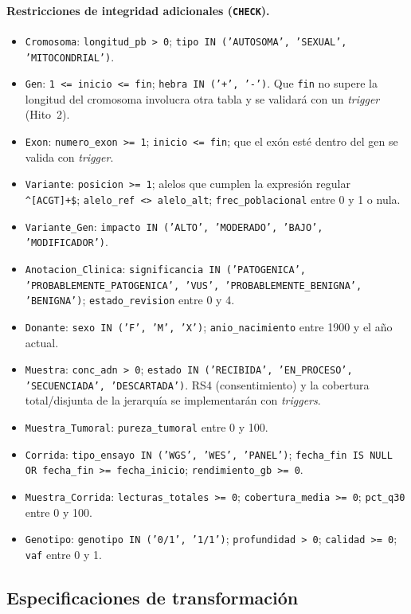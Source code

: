 \documentclass[11pt,a4paper]{article}
\newcommand{\tb}[1]{\texttt{#1}}
\begin{document}
\paragraph{Restricciones de integridad adicionales (\tb{CHECK}).}\begingroup\sloppy
\begin{itemize}
  \item \tb{Cromosoma}: \tb{longitud\_pb > 0}; \tb{tipo IN ('AUTOSOMA', 'SEXUAL', 'MITOCONDRIAL')}.
  \item \tb{Gen}: \tb{1 <= inicio <= fin}; \tb{hebra IN ('+', '-')}. Que \tb{fin} no supere la longitud del cromosoma involucra otra tabla y se validará con un \emph{trigger} (Hito~2).
  \item \tb{Exon}: \tb{numero\_exon >= 1}; \tb{inicio <= fin}; que el exón esté dentro del gen se valida con \emph{trigger}.
  \item \tb{Variante}: \tb{posicion >= 1}; alelos que cumplen la expresión regular \tb{\textasciicircum[ACGT]+\$}; \tb{alelo\_ref <> alelo\_alt}; \tb{frec\_poblacional} entre 0 y 1 o nula.
  \item \tb{Variante\_Gen}: \tb{impacto IN ('ALTO', 'MODERADO', 'BAJO', 'MODIFICADOR')}.
  \item \tb{Anotacion\_Clinica}: \tb{significancia IN ('PATOGENICA', 'PROBABLEMENTE\_PATOGENICA', 'VUS', 'PROBABLEMENTE\_BENIGNA', 'BENIGNA')}; \tb{estado\_revision} entre 0 y 4.
  \item \tb{Donante}: \tb{sexo IN ('F', 'M', 'X')}; \tb{anio\_nacimiento} entre 1900 y el año actual.
  \item \tb{Muestra}: \tb{conc\_adn > 0}; \tb{estado IN ('RECIBIDA', 'EN\_PROCESO', 'SECUENCIADA', 'DESCARTADA')}. RS4 (consentimiento) y la cobertura total/disjunta de la jerarquía se implementarán con \emph{triggers}.
  \item \tb{Muestra\_Tumoral}: \tb{pureza\_tumoral} entre 0 y 100.
  \item \tb{Corrida}: \tb{tipo\_ensayo IN ('WGS', 'WES', 'PANEL')}; \tb{fecha\_fin IS NULL OR fecha\_fin >= fecha\_inicio}; \tb{rendimiento\_gb >= 0}.
  \item \tb{Muestra\_Corrida}: \tb{lecturas\_totales >= 0}; \tb{cobertura\_media >= 0}; \tb{pct\_q30} entre 0 y 100.
  \item \tb{Genotipo}: \tb{genotipo IN ('0/1', '1/1')}; \tb{profundidad > 0}; \tb{calidad >= 0}; \tb{vaf} entre 0 y 1.
\end{itemize}\endgroup

\subsection{Especificaciones de transformación}
\end{document}
